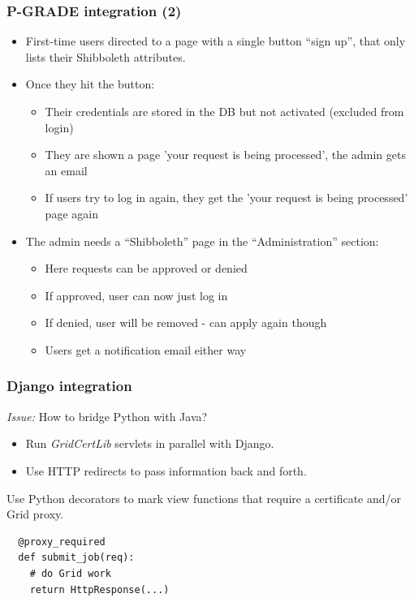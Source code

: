 \documentclass{beamer}
\newcommand{\+}{\vspace{1em}}
\begin{document}
\begin{frame}
  \frametitle{P-GRADE integration (2)}

  \begin{itemize}\item First-time users directed to a page with
    a single button ``sign up'', that only lists their Shibboleth attributes.
  \item Once they hit the button: 
    \begin{itemize}
    \item Their credentials are stored in the DB
      but not activated (excluded from login)
    \item They are shown a page 'your request is being processed', the
      admin gets an email
    \item If users try to log in again, they get the 'your request is
      being processed' page again
    \end{itemize}
  \item The admin needs a ``Shibboleth'' page in the ``Administration''
    section:
    \begin{itemize}
    \item Here requests can be approved or denied
    \item If approved, user can now just log in
    \item If denied, user will be removed - can apply again though
    \item Users get a notification email either way
    \end{itemize}
  \end{itemize}
\end{frame}


\begin{frame}[fragile]
  \frametitle{Django integration}

  \emph{Issue:} How to bridge Python with Java?
  \begin{itemize}
  \item Run \emph{GridCertLib} servlets in parallel with Django.
  \item Use HTTP redirects to pass information back and forth.
  \end{itemize}

  \+
  Use Python decorators to mark view functions that require a
  certificate and/or Grid proxy.
\begin{verbatim}
  @proxy_required
  def submit_job(req):
    # do Grid work
    return HttpResponse(...)
\end{verbatim}

\end{frame}
\end{document}
